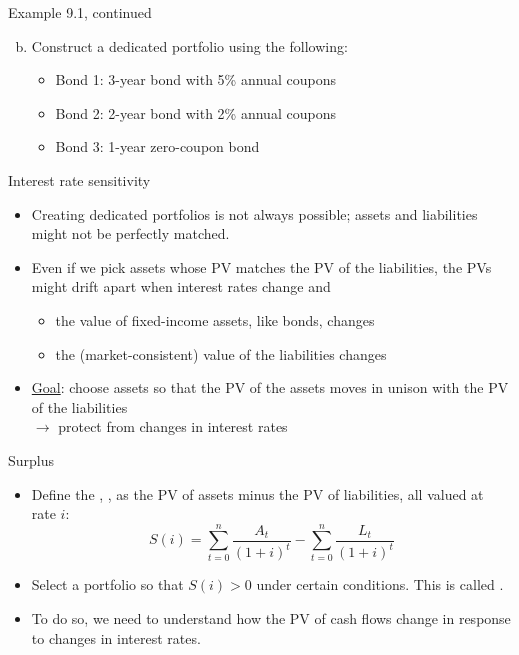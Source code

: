 \documentclass{beamer}
\begin{document}
\begin{frame}{Example 9.1, continued}

\begin{enumerate}[a)]
\setcounter{enumi}{1}
\item Construct a dedicated portfolio using the following:
\begin{itemize}
\item Bond 1: 3-year bond with 5\% annual coupons
\item Bond 2: 2-year bond with 2\% annual coupons
\item Bond 3: 1-year zero-coupon bond
\end{itemize}
\end{enumerate}

\begin{center}
\end{center}

\vfill
\end{frame}

\begin{frame}{Interest rate sensitivity}

\begin{itemize}
\item Creating dedicated portfolios is not always possible; assets and liabilities might not be perfectly matched.
\medskip
\item Even if we pick assets whose PV matches the PV of the liabilities, the PVs might drift apart when interest rates change and
\begin{itemize}
\item the value of fixed-income assets, like bonds, changes
\item the (market-consistent) value of the liabilities changes
\end{itemize}
\medskip
\item \underline{Goal}: choose assets so that the PV of the assets moves in unison with the PV of the liabilities \\
$\rightarrow$ protect  from changes in interest rates
\end{itemize}

\end{frame}

\begin{frame}{Surplus}

\begin{itemize}
\item Define the , , as the PV of assets minus the PV of liabilities, all valued at rate $i$:
\[
S(i) = \sum_{t=0}^{n} \frac{A_t}{(1+i)^t} - \sum_{t=0}^{n} \frac{L_t}{(1+i)^t}
\]
\item Select a portfolio so that $S(i) > 0$ under certain conditions. This is called .
\medskip
\item To do so, we need to understand how the PV of cash flows change in response to changes in interest rates.
\end{itemize}

\end{frame}
\end{document}

